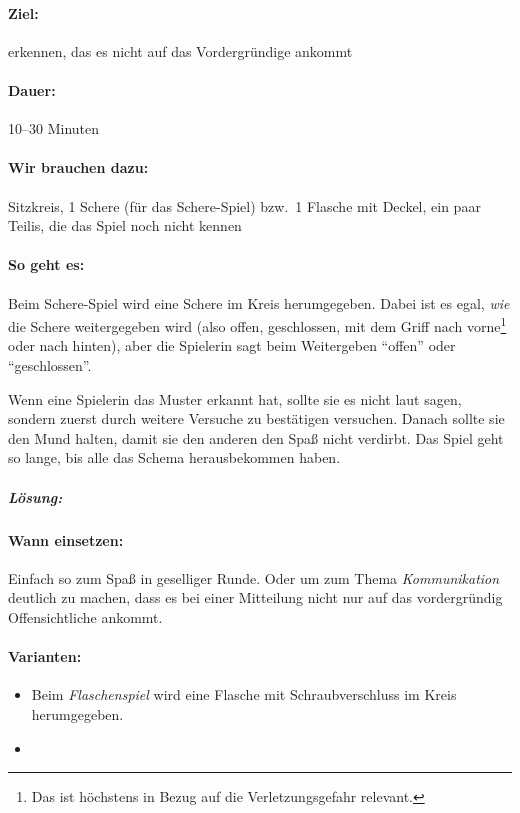 \paragraph{Ziel:} erkennen, das es nicht auf das Vordergründige ankommt
\paragraph{Dauer:} 10--30 Minuten
\paragraph{Wir brauchen dazu:} Sitzkreis, 1 Schere (für das Schere-Spiel) bzw.~1 Flasche mit Deckel, ein paar Teilis, die das Spiel noch nicht kennen
\paragraph{So geht es:} Beim Schere-Spiel wird eine Schere im Kreis herumgegeben. Dabei ist es egal, \emph{wie} die Schere weitergegeben wird (also offen, geschlossen, mit dem Griff nach vorne\footnote{Das ist höchstens in Bezug auf die Verletzungsgefahr relevant.} oder nach hinten), aber die Spielerin sagt beim Weitergeben "`offen"' oder "`geschlossen"'.

Wenn eine Spielerin das Muster erkannt hat, sollte sie es nicht laut sagen, sondern zuerst durch weitere Versuche zu bestätigen versuchen. Danach sollte sie den Mund halten, damit sie den anderen den Spaß nicht verdirbt. Das Spiel geht so lange, bis alle das Schema herausbekommen haben.

\subparagraph{Lösung:}
\vspace{.5em}

\paragraph{Wann einsetzen:} Einfach so zum Spaß in geselliger Runde. Oder um zum Thema \emph{Kommunikation} deutlich zu machen, dass es bei einer Mitteilung nicht nur auf das vordergründig Offensichtliche ankommt.
\paragraph{Varianten:}
\begin{itemize}
	\item Beim \emph{Flaschenspiel} wird eine Flasche mit Schraubverschluss im Kreis herumgegeben.
	\item
\end{itemize}

